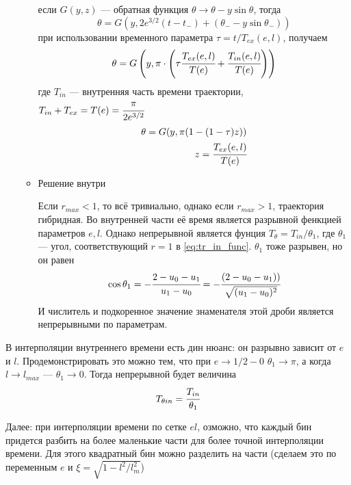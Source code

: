 \begin{enumerate}
\begin{itemize}
			если $G(y,z) $ --- обратная функция $\theta \rightarrow \theta - y \sin{\theta}$, тогда
			\begin{equation*}
				\theta = G(y,2e^{3/2}(t-t_{-}) + (\theta_{-} - y\sin{\theta_{-}})) 
			\end{equation*}
			при использовании временного параметра $\tau = t/T_{ex}(e,l)$, получаем
			\begin{equation*}
				\theta = G\left(y,\pi \cdot \left(\tau \cfrac{T_{ex}(e,l)}{T(e)} +
				\cfrac{T_{in}(e,l)}{T(e)}
				\right) \right) 
			\end{equation*}
			где $T_{in}$ --- внутренняя часть времени траектории, $T_{in} + T_{ex} = T(e) = \cfrac{\pi}{2e^{3/2}}$
			\begin{eqnarray*}
				\theta = G(y,\pi (1 -(1 - \tau)z ) ) \\
				z = \cfrac{T_{ex}(e,l)}{T(e)}
			\end{eqnarray*}
			\item Решение внутри
			
			Если $r_{max} < 1$, то всё тривиально, однако если $r_{max} > 1$, траектория гибридная. Во внутренней части её время является разрывной фенкцией параметров $e, l$. 
			Однако непрерывной является фунция $T_{\theta} = T_{in}/\theta_1$, где $\theta_1$ --- угол, соответствующий $r = 1$ в \ref{eq:tr_in_func}. $\theta_1$ тоже разрывен, но он равен
			\begin{equation}
				\cos{\theta_1} = -\cfrac{2-u_0-u_1}{u_1-u_0} = 
				-\cfrac{(2-u_0-u_1))}{\sqrt{(u_1-u_0)^2}} 
			\end{equation}
			И числитель и подкоренное значение знаменателя этой дроби является непрерывными по параметрам.
		\end{itemize}
	\end{enumerate}
	
	В интерполяции внутреннего времени есть дин нюанс: он разрывно зависит от $e$ и $l$.
	Продемонстрировать это можно тем, что при $e \rightarrow 1/2-0$ $\theta_1 \rightarrow \pi$, а когда  $l \rightarrow l_{max}$ --- $\theta_1 \rightarrow 0$. Тогда непрерывной будет величина 
	\begin{equation}
		T_{\theta in} = \cfrac{T_{in}}{\theta_1}
	\end{equation}
	
	Далее: при интерполяции времени по сетке $el$, озможно, что каждый бин придется разбить на более маленькие части для более точной интерполяции времени. Для этого квадратный бин можно разделить на части (сделаем это по переменным $e$ и $\xi = \sqrt{1-l^2/l_m^2}$)
	
